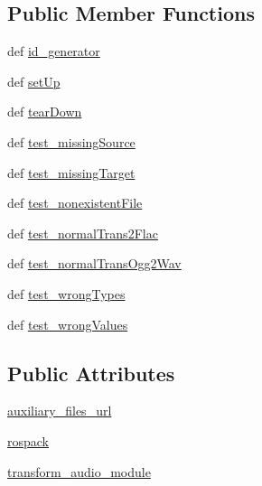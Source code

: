 \subsection*{Public Member Functions}
\begin{DoxyCompactItemize}
\item 
def \hyperlink{classtransform__audio__unit__tests_1_1TestAudioProcessing_a44cdd2f28c01d3d3e92b13833286c04b}{id\-\_\-generator}
\item 
def \hyperlink{classtransform__audio__unit__tests_1_1TestAudioProcessing_a37987b2d4dade71f23e6b2dbb344db25}{set\-Up}
\item 
def \hyperlink{classtransform__audio__unit__tests_1_1TestAudioProcessing_a7759b1fb95cb6f25a73373ba03f0e33e}{tear\-Down}
\item 
def \hyperlink{classtransform__audio__unit__tests_1_1TestAudioProcessing_a99b32b0c2dfa5642c4392ff3aa552b79}{test\-\_\-missing\-Source}
\item 
def \hyperlink{classtransform__audio__unit__tests_1_1TestAudioProcessing_a142b46138ed651dbe67b719fa3253c9c}{test\-\_\-missing\-Target}
\item 
def \hyperlink{classtransform__audio__unit__tests_1_1TestAudioProcessing_ac7154e9b8466da4f0d522c198d2e173d}{test\-\_\-nonexistent\-File}
\item 
def \hyperlink{classtransform__audio__unit__tests_1_1TestAudioProcessing_a0c191b29541490d9914e279804c9e157}{test\-\_\-normal\-Trans2\-Flac}
\item 
def \hyperlink{classtransform__audio__unit__tests_1_1TestAudioProcessing_a7053a3b5740d8f633384bdfb00cc6b7c}{test\-\_\-normal\-Trans\-Ogg2\-Wav}
\item 
def \hyperlink{classtransform__audio__unit__tests_1_1TestAudioProcessing_ac38a482686c1bb26e8947fd7720f1ba4}{test\-\_\-wrong\-Types}
\item 
def \hyperlink{classtransform__audio__unit__tests_1_1TestAudioProcessing_af79a01b2a97e81caf73811059d2212de}{test\-\_\-wrong\-Values}
\end{DoxyCompactItemize}
\subsection*{Public Attributes}
\begin{DoxyCompactItemize}
\item 
\hyperlink{classtransform__audio__unit__tests_1_1TestAudioProcessing_af77f3c3971f5374423e19642928df999}{auxiliary\-\_\-files\-\_\-url}
\item 
\hyperlink{classtransform__audio__unit__tests_1_1TestAudioProcessing_a3bd387590dace3bf1abda6dcfed8402e}{rospack}
\item 
\hyperlink{classtransform__audio__unit__tests_1_1TestAudioProcessing_a7b1be66c70205421b0b9668f02e1fe22}{transform\-\_\-audio\-\_\-module}
\end{DoxyCompactItemize}


